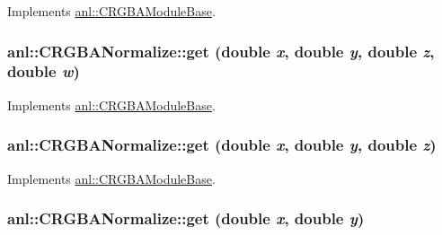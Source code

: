 Implements \hyperlink{classanl_1_1CRGBAModuleBase_aa5a0b719101302596a697aa8c2292f55}{anl::CRGBAModuleBase}.\hypertarget{classanl_1_1CRGBANormalize_a42a91db8a13d2b771f81ed1a55ee9eff}{
\subsubsection[{get}]{ anl::CRGBANormalize::get (double {\em x}, \/  double {\em y}, \/  double {\em z}, \/  double {\em w})}}
\label{classanl_1_1CRGBANormalize_a42a91db8a13d2b771f81ed1a55ee9eff}


Implements \hyperlink{classanl_1_1CRGBAModuleBase_ab94523074ef298bb99f0830051e78c1c}{anl::CRGBAModuleBase}.\hypertarget{classanl_1_1CRGBANormalize_aaa04a3a2cb2ce5fd15e574731ac6f183}{
\subsubsection[{get}]{ anl::CRGBANormalize::get (double {\em x}, \/  double {\em y}, \/  double {\em z})}}
\label{classanl_1_1CRGBANormalize_aaa04a3a2cb2ce5fd15e574731ac6f183}


Implements \hyperlink{classanl_1_1CRGBAModuleBase_a097897c2d625c824832325260169c90e}{anl::CRGBAModuleBase}.\hypertarget{classanl_1_1CRGBANormalize_a02fcc5f3c5df6750712c28afa66a6ccd}{
\subsubsection[{get}]{ anl::CRGBANormalize::get (double {\em x}, \/  double {\em y})}}
\label{classanl_1_1CRGBANormalize_a02fcc5f3c5df6750712c28afa66a6ccd}


